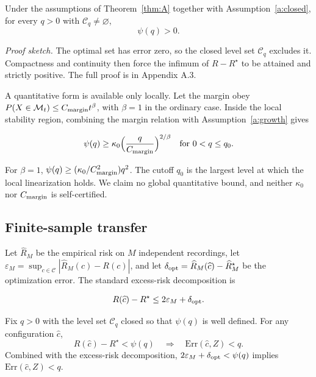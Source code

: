 \begin{theorem}\label{thm:B}
Under the assumptions of Theorem~\ref{thm:A} together with Assumption~\ref{a:closed}, for every $q>0$ with $\mathcal C_q\ne\varnothing$,
\begin{equation}\label{eq:compatibility}
\psi(q)>0.
\end{equation}
\end{theorem}

\emph{Proof sketch.} The optimal set has error zero, so the closed level
set \(\mathcal C_q\) excludes it. Compactness and continuity then force
the infimum of \(R-R^\star\) to be attained and strictly positive. The
full proof is in Appendix A.3.

A quantitative form is available only locally. Let the margin obey
\(P(X\in\mathcal M_t)\le C_{\rm margin}t^\beta\), with \(\beta=1\) in
the ordinary case. Inside the local stability region, combining the
margin relation with Assumption~\ref{a:growth} gives

\[\psi(q)\ge\kappa_0\Big(\frac{q}{C_{\rm margin}}\Big)^{2/\beta}\quad\text{for }0<q\le q_0.\]

For \(\beta=1\), \(\psi(q)\ge(\kappa_0/C_{\rm margin}^2)q^2\). The
cutoff \(q_0\) is the largest level at which the local linearization
holds. We claim no global quantitative bound, and neither \(\kappa_0\)
nor \(C_{\rm margin}\) is self-certified.

\subsection{Finite-sample transfer}\label{finite-sample-transfer}

Let \(\widehat R_M\) be the empirical risk on \(M\) independent
recordings, let
\(\varepsilon_M=\sup_{c\in\mathcal C}|\widehat R_M(c)-R(c)|\), and let
\(\delta_{\rm opt}=\widehat R_M(\widehat c)-\widehat R_M^\star\) be the
optimization error. The standard excess-risk decomposition is

\begin{equation}\label{eq:risk-gap}
R(\widehat c)-R^\star\le 2\varepsilon_M+\delta_{\rm opt}.
\end{equation}

\begin{lemma}\label{lem:transfer}
Fix $q>0$ with the level set $\mathcal C_q$ closed so that $\psi(q)$ is well defined. For any configuration $\widehat c$,
$$R(\widehat c)-R^\star<\psi(q)\quad\Longrightarrow\quad \mathrm{Err}(\widehat c,Z)<q.$$
Combined with the excess-risk decomposition, $2\varepsilon_M+\delta_{\rm opt}<\psi(q)$ implies $\mathrm{Err}(\widehat c,Z)<q$.
\end{lemma}


